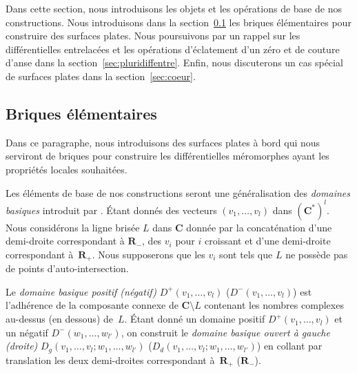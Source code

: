 \documentclass[JEP,XML,SOM,Unicode,francais,NoFloatCountersInSection,published]{cedram}
\newcommand{\RR}{\mathbf{R}}
\newcommand{\CC}{\mathbf{C}}
\theoremstyle{definition}
\begin{document}
Dans cette section, nous introduisons les objets et les opérations de base de nos constructions. Nous introduisons dans la section~\ref{sec:briques} les briques élémentaires pour construire des surfaces plates. Nous poursuivons par un rappel sur les différentielles entrelacées et les opérations d’éclatement d'un zéro et de couture d'anse dans la section~\ref{sec:pluridiffentre}. Enfin, nous discuterons un cas spécial de surfaces plates dans la section~\ref{sec:coeur}.

\subsection{Briques élémentaires}
\label{sec:briques}

Dans ce paragraphe, nous introduisons des surfaces plates à bord qui nous serviront de briques pour construire les différentielles méromorphes ayant les propriétés locales souhaitées.

Les éléments de base de nos constructions seront une généralisation des \emph{domaines basiques} introduit par \cite{Bo}. Étant donnés des vecteurs $(v_{1},\dots,v_{l})$ dans $(\CC^{\ast})^{l}$. Nous considérons la ligne brisée $L$ dans $\CC$ donnée par la concaténation d'une demi-droite correspondant à $\RR_{-}$, des $v_{i}$ pour $i$ croissant et d'une demi-droite correspondant à~$\RR_{+}$.
Nous supposerons que les $v_{i}$ sont tels que $L$ ne possède pas de points d'auto-intersection.

Le \emph{domaine basique positif (\resp négatif)} $D^{+}(v_{1},\dots,v_{l})$ (\resp $D^{-}(v_{1},\dots,v_{l})$) est l'adhérence de la composante connexe de $\CC\setminus L$ contenant les nombres complexes au-dessus (\resp en dessous) de~$L$.
Étant donné un domaine positif $D^{+}(v_{1},\dots,v_{l})$ et un négatif $D^{-}(w_{1},\dots,w_{l'})$, on construit le \emph{domaine basique ouvert à gauche (\resp droite)} $D_{g}(v_{1},\dots,v_{l};w_{1},\dots,w_{l'})$ (\resp $D_{d}(v_{1},\dots,v_{l};w_{1},\dots,w_{l'})$) en collant par translation les deux demi-droites correspondant à~$\RR_{+}$ (\resp $\RR_{-}$).
\end{document}

